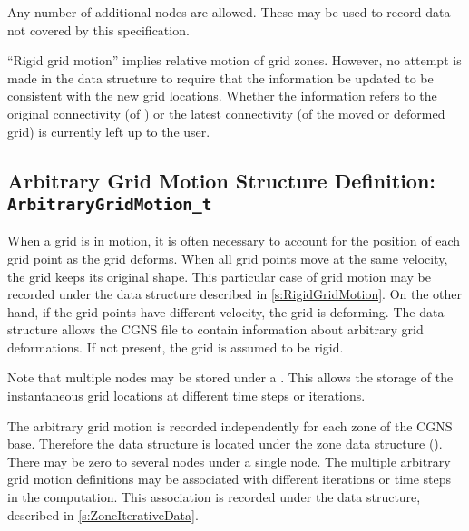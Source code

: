 Any number of additional  nodes are allowed.
These may be used to record data not covered by this specification.

``Rigid grid motion'' implies relative motion of grid zones.
However, no attempt is made in the  data
structure to require that the  information
be updated to be consistent with the new grid locations.
Whether the  information refers to
the original connectivity (of ) or the latest
connectivity (of the moved or deformed grid) is currently left up to the
user.

\subsection{Arbitrary Grid Motion Structure Definition: \texttt{ArbitraryGridMotion\_t}}
\label{s:ArbitraryGridMotion}

When a grid is in motion, it is often necessary to account for the
position of each grid point as the grid deforms.
When all grid points move at the same velocity, the grid keeps its
original shape.
This particular case of grid motion may be recorded under the
 data structure described in
\autoref{s:RigidGridMotion}.
On the other hand, if the grid points have different velocity, the grid
is deforming.
The  data structure allows the CGNS file to
contain information about arbitrary grid deformations.
If not present, the grid is assumed to be rigid.

Note that multiple  nodes may be stored under a
.
This allows the storage of the instantaneous grid locations at different
time steps or iterations.

The arbitrary grid motion is recorded independently for each zone of the
CGNS base.
Therefore the  data structure is located
under the zone data structure ().
There may be zero to several  nodes under a
single  node.
The multiple arbitrary grid motion definitions may be associated with
different iterations or time steps in the computation.
This association is recorded under the  data
structure, described in \autoref{s:ZoneIterativeData}.

